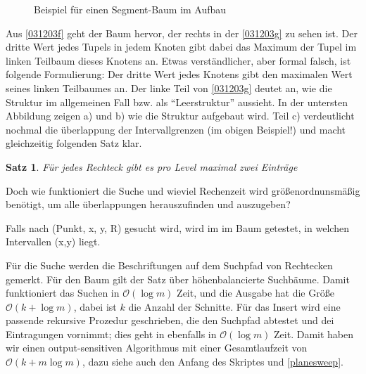 \documentclass[ngerman,draft,parskip=half*,twoside]{scrreprt}
\theoremstyle{break}
\newtheorem{satz}{Satz}[chapter]
\theoremstyle{nonumberbreak}
\newcommand*{\OO}{\mathcal{O}}      %
\begin{document}
\begin{figure}[H]
\centering
 \hspace{1cm}  \hspace{1cm} 
\caption{Beispiel für einen Segment-Baum im Aufbau}
\label{031203i}

\end{figure}

Aus \autoref{031203f} geht der Baum hervor, der rechts in der \autoref{031203g} zu sehen ist. Der dritte Wert jedes Tupels
in jedem Knoten
gibt dabei das Maximum der Tupel im linken Teilbaum dieses Knotens an. Etwas verständlicher, aber formal falsch, ist folgende
Formulierung: Der dritte Wert jedes Knotens gibt den maximalen Wert seines linken Teilbaumes an.
Der linke Teil von 
\autoref{031203g} deutet an, wie die Struktur im allgemeinen Fall bzw. als "`Leerstruktur"' aussieht. In der untersten Abbildung zeigen a) und
b) wie die Struktur aufgebaut wird. Teil c) verdeutlicht nochmal die überlappung der Intervallgrenzen (im obigen Beispiel!) und macht
gleichzeitig folgenden Satz klar.

\begin{satz}
Für jedes Rechteck gibt es pro Level maximal zwei Einträge
\end{satz} 

Doch wie funktioniert die Suche und wieviel Rechenzeit wird größenordnunsmäßig benötigt, um alle überlappungen herauszufinden und
auszugeben?

Falls nach (Punkt, x, y, R) gesucht wird, wird im im Baum getestet, in welchen Intervallen (x,y) liegt. 


Für die Suche werden die Beschriftungen auf dem Suchpfad von Rechtecken gemerkt. Für den Baum gilt der Satz über höhenbalancierte
Suchbäume. Damit funktioniert das Suchen in $\OO(\log m)$ Zeit, und die Ausgabe hat die Größe $\OO(k+ \log m)$, dabei ist $k$ die Anzahl
der Schnitte. Für das Insert wird eine passende rekursive Prozedur geschrieben, die den Suchpfad abtestet und dei Eintragungen
vornimmt; dies geht in ebenfalls in $\OO(\log m)$ Zeit.
Damit haben wir einen output-sensitiven Algorithmus mit einer Gesamtlaufzeit von $\OO(k +m \log m)$, dazu siehe auch den Anfang des
Skriptes und \autoref{planesweep}.
\end{document}
